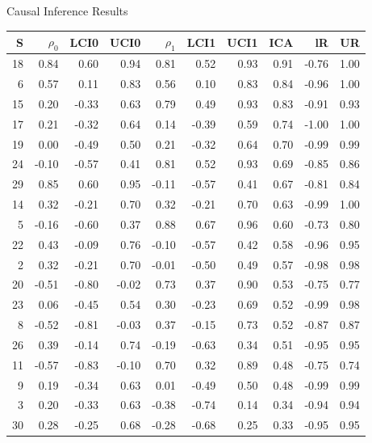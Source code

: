 \documentclass[a4paper,9pt]{beamer}\usepackage[]{graphicx}\usepackage[]{color}
\begin{document}
\begin{frame}{Causal Inference Results}
\tiny
\begin{table}[H]
\centering
\begin{tabular}{rrrrrrrrrr}
  \hline
S & $\rho_0$ & LCI0 & UCI0 & $\rho_1$ & LCI1 & UCI1 & ICA & lR & UR \\ 
  \hline
 \alert{18} & 0.84 & 0.60 & 0.94 & 0.81 & 0.52 & 0.93 & 0.91 & -0.76 & 1.00 \\ 
    \alert{6} & 0.57 & 0.11 & 0.83 & 0.56 & 0.10 & 0.83 & 0.84 & -0.96 & 1.00 \\ 
   \alert{15} & 0.20 & -0.33 & 0.63 & 0.79 & 0.49 & 0.93 & 0.83 & -0.91 & 0.93 \\ 
   \alert{17} & 0.21 & -0.32 & 0.64 & 0.14 & -0.39 & 0.59 & 0.74 & -1.00 & 1.00 \\ 
   \alert{19} & 0.00 & -0.49 & 0.50 & 0.21 & -0.32 & 0.64 & 0.70 & -0.99 & 0.99 \\ 
   \alert{24} & -0.10 & -0.57 & 0.41 & 0.81 & 0.52 & 0.93 & 0.69 & -0.85 & 0.86 \\ 
   \alert{29} & 0.85 & 0.60 & 0.95 & -0.11 & -0.57 & 0.41 & 0.67 & -0.81 & 0.84 \\ 
   \alert{14} & 0.32 & -0.21 & 0.70 & 0.32 & -0.21 & 0.70 & 0.63 & -0.99 & 1.00 \\ 
    \alert{5} & -0.16 & -0.60 & 0.37 & 0.88 & 0.67 & 0.96 & 0.60 & -0.73 & 0.80 \\ 
   \alert{22} & 0.43 & -0.09 & 0.76 & -0.10 & -0.57 & 0.42 & 0.58 & -0.96 & 0.95 \\ 
    2 & 0.32 & -0.21 & 0.70 & -0.01 & -0.50 & 0.49 & 0.57 & -0.98 & 0.98 \\ 
   20 & -0.51 & -0.80 & -0.02 & 0.73 & 0.37 & 0.90 & 0.53 & -0.75 & 0.77 \\ 
   23 & 0.06 & -0.45 & 0.54 & 0.30 & -0.23 & 0.69 & 0.52 & -0.99 & 0.98 \\ 
    8 & -0.52 & -0.81 & -0.03 & 0.37 & -0.15 & 0.73 & 0.52 & -0.87 & 0.87 \\ 
   26 & 0.39 & -0.14 & 0.74 & -0.19 & -0.63 & 0.34 & 0.51 & -0.95 & 0.95 \\ 
   11 & -0.57 & -0.83 & -0.10 & 0.70 & 0.32 & 0.89 & 0.48 & -0.75 & 0.74 \\ 
    9 & 0.19 & -0.34 & 0.63 & 0.01 & -0.49 & 0.50 & 0.48 & -0.99 & 0.99 \\ 
    3 & 0.20 & -0.33 & 0.63 & -0.38 & -0.74 & 0.14 & 0.34 & -0.94 & 0.94 \\ 
   30 & 0.28 & -0.25 & 0.68 & -0.28 & -0.68 & 0.25 & 0.33 & -0.95 & 0.95 \\ 

\end{tabular}
\end{table}
\end{frame}
\end{document}
